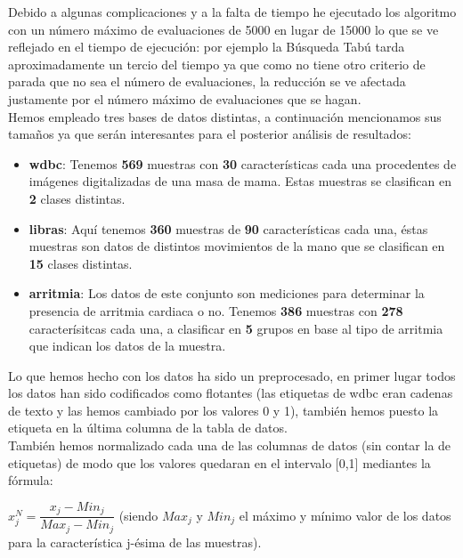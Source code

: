 \documentclass[10pt,a4paper]{article}
\begin{document}
Debido a algunas complicaciones y a la falta de tiempo he ejecutado los algoritmo con un número máximo de evaluaciones de 5000 en lugar de 15000 lo que se ve reflejado en el tiempo de ejecución: por ejemplo la Búsqueda Tabú tarda aproximadamente un tercio del tiempo ya que como no tiene otro criterio de parada que no sea el número de evaluaciones, la reducción se ve afectada justamente por el número máximo de evaluaciones que se hagan.\\

Hemos empleado tres bases de datos distintas, a continuación mencionamos sus tamaños ya que serán interesantes para el posterior análisis de resultados:\\

\begin{itemize}
\item \textbf{wdbc}: Tenemos \textbf{569} muestras con \textbf{30} características cada una procedentes de imágenes digitalizadas de una masa de mama. Estas muestras se clasifican en \textbf{2} clases distintas.
\item \textbf{libras}: Aquí tenemos \textbf{360} muestras de \textbf{90} características cada una, éstas muestras son datos de distintos movimientos de la mano que se clasifican en \textbf{15} clases distintas.
\item \textbf{arritmia}: Los datos de este conjunto son mediciones para determinar la presencia de arritmia cardiaca o no. Tenemos \textbf{386} muestras con \textbf{278} caracterísitcas cada una, a clasificar en \textbf{5} grupos en base al tipo de arritmia que indican los datos de la muestra.
\end{itemize}

Lo que hemos hecho con los datos ha sido un preprocesado, en primer lugar todos los datos han sido codificados como flotantes (las etiquetas de wdbc eran cadenas de texto y las hemos cambiado por los valores 0 y 1), también hemos puesto la etiqueta en la última columna de la tabla de datos.\\

También hemos normalizado cada una de las columnas de datos (sin contar la de etiquetas) de modo que los valores quedaran en el intervalo [0,1] mediantes la fórmula:\\

\begin{center}
$x_j^N = \dfrac{x_j - Min_j}{Max_j-Min_j}$ (siendo $Max_j$ y $Min_j$ el máximo y mínimo valor de los datos para la característica j-ésima de las muestras).
\end{center}
\end{document}
